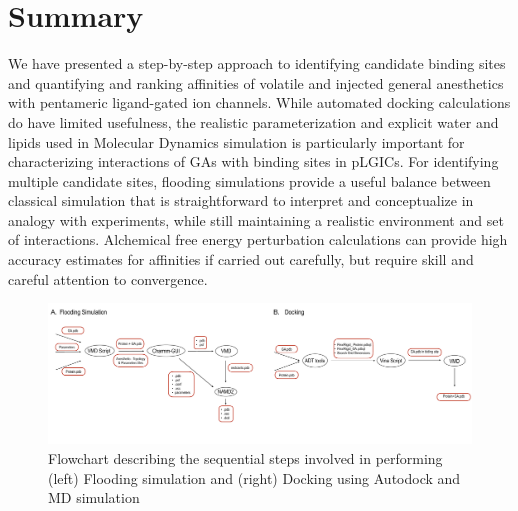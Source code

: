 \documentclass[12pt]{article}
\begin{document}
\section*{Summary}
We have presented a step-by-step approach to identifying candidate binding sites and quantifying and ranking affinities of volatile and injected general anesthetics with pentameric ligand-gated ion channels. While automated docking calculations do have limited usefulness, the realistic parameterization and explicit water and lipids used in Molecular Dynamics simulation is particularly important for characterizing interactions of GAs with binding sites in pLGICs. For identifying multiple candidate sites,  flooding simulations provide a useful balance between classical simulation that is straightforward to interpret and conceptualize in analogy with experiments, while still maintaining a realistic environment and set of interactions.  Alchemical free energy perturbation calculations can provide high accuracy estimates for affinities if carried out carefully, but require skill and careful attention to convergence.  


\clearpage



\begin{figure}
\begin{center}
\centering
\includegraphics[width = 1\textwidth]{finlpics/Figure_1}
\caption{Flowchart describing  the sequential steps involved in performing (left) Flooding simulation and (right) Docking using Autodock and MD simulation}
\label{fig:flowchart_flood}
\end{center}
\end{figure}
\end{document}
